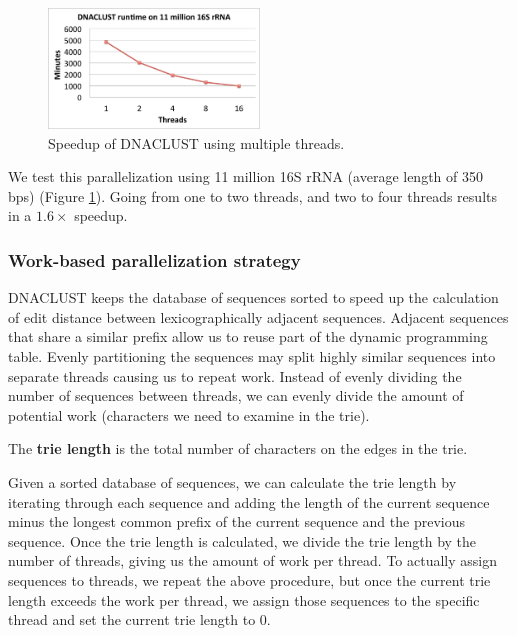 \begin{figure}[tb]
  \centering
    \includegraphics[width=0.5\textwidth]{parallel}
  \caption{Speedup of DNACLUST using multiple threads.}
  \label{fig:parallel}
\end{figure}

We test this parallelization using 11 million 16S rRNA (average length of 350 bps) (Figure \ref{fig:parallel}).
Going from one to two threads, and two to four threads results in a $1.6\times$ speedup.

\subsubsection{Work-based parallelization strategy}

DNACLUST keeps the database of sequences sorted to speed up the calculation of edit distance between lexicographically adjacent sequences.
Adjacent sequences that share a similar prefix allow us to reuse part of the dynamic programming table.
Evenly partitioning the sequences may split highly similar sequences into separate threads causing us to repeat work.
Instead of evenly dividing the number of sequences between threads, we can evenly divide the amount of potential work (characters we need to examine in the trie).

\begin{definition}
The {\bf trie length} is the total number of characters on the edges in the trie.
\end{definition}

Given a sorted database of sequences, we can calculate the trie length by iterating through each sequence and adding the length of the current sequence minus the longest common prefix of the current sequence and the previous sequence.
Once the trie length is calculated, we divide the trie length by the number of threads, giving us the amount of work per thread.
To actually assign sequences to threads, we repeat the above procedure, but once the current trie length exceeds the work per thread, we assign those sequences to the specific thread and set the current trie length to 0.

